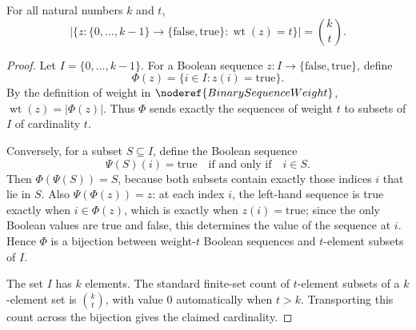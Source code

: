 \begin{helper}
For all natural numbers \(k\) and \(t\),
\[
  \left|\{z:\{0,\ldots,k-1\}\to\{\mathrm{false},\mathrm{true}\}
    : \operatorname{wt}(z)=t\}\right|=\binom{k}{t}.
\]
\end{helper}
\begin{proof}
Let \(I=\{0,\ldots,k-1\}\). For a Boolean sequence \(z:I\to
\{\mathrm{false},\mathrm{true}\}\), define
\[
  \Phi(z)=\{i\in I:z(i)=\mathrm{true}\}.
\]
By the definition of weight in \(\noderef{BinarySequenceWeight}\),
\(\operatorname{wt}(z)=|\Phi(z)|\). Thus \(\Phi\) sends exactly the sequences
of weight \(t\) to subsets of \(I\) of cardinality \(t\).

Conversely, for a subset \(S\subseteq I\), define the Boolean sequence
\[
  \Psi(S)(i)=\mathrm{true}\quad\text{if and only if}\quad i\in S.
\]
Then \(\Phi(\Psi(S))=S\), because both subsets contain exactly those indices
\(i\) that lie in \(S\). Also \(\Psi(\Phi(z))=z\): at each index \(i\), the
left-hand sequence is true exactly when \(i\in\Phi(z)\), which is exactly when
\(z(i)=\mathrm{true}\); since the only Boolean values are true and false, this
determines the value of the sequence at \(i\). Hence \(\Phi\) is a bijection
between weight-\(t\) Boolean sequences and \(t\)-element subsets of \(I\).

The set \(I\) has \(k\) elements. The standard finite-set count of
\(t\)-element subsets of a \(k\)-element set is \(\binom{k}{t}\), with value
\(0\) automatically when \(t>k\). Transporting this count across the bijection
gives the claimed cardinality.
\end{proof}
